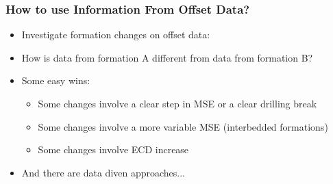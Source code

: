 \documentclass{beamer}
\begin{document}
\begin{frame} \frametitle{How to use Information From Offset Data?} 
\vspace{-1cm}

\begin{itemize}
\item<1-> Investigate formation changes on offset data:
\item<2-> How is data from formation A different from data from formation B?
\item<3-> Some easy wins:
\begin{itemize}
\item<4-> Some changes involve a clear step in MSE or a clear drilling break
\item<5-> Some changes involve a more variable MSE (interbedded formations)
\item<6-> Some changes involve ECD increase 
\end{itemize}
\item<7-> And there are data diven approaches...
\end{itemize}
\end{frame}
\end{document}
